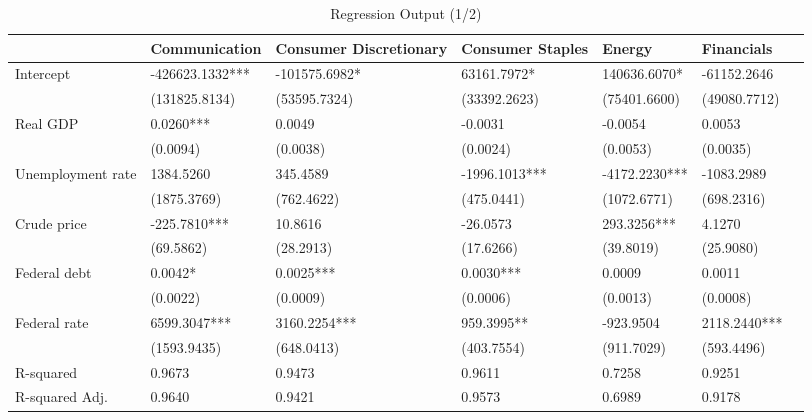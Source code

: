 \documentclass[a4paper,12pt]{article}
\begin{document}
\begin{table}
\caption{Regression Output (1/2)}
\label{}
\begin{center}
\tiny
\begin{tabular}{lllllll} \hline                  & Communication & Consumer Discretionary & Consumer Staples & Energy  & Financials  \\  \hline 
Intercept          & -426623.1332***     & -101575.6982*      & 63161.7972*        & 140636.6070*  & -61152.2646    \\                    & (131825.8134)       & (53595.7324)       & (33392.2623)       & (75401.6600)  & (49080.7712)     \\  
Real GDP          & 0.0260***           & 0.0049             & -0.0031            & -0.0054       & 0.0053          \\                   & (0.0094)            & (0.0038)           & (0.0024)           & (0.0053)      & (0.0035)           \\  
Unemployment rate & 1384.5260           & 345.4589           & -1996.1013***      & -4172.2230*** & -1083.2989        \\                    & (1875.3769)         & (762.4622)         & (475.0441)         & (1072.6771)   & (698.2316)        \\  
Crude price       & -225.7810***        & 10.8616            & -26.0573           & 293.3256***   & 4.1270   \\                    & (69.5862)           & (28.2913)          & (17.6266)          & (39.8019)     & (25.9080)    \\ 
Federal debt      & 0.0042*             & 0.0025***          & 0.0030***          & 0.0009        & 0.0011        \\                   & (0.0022)            & (0.0009)           & (0.0006)           & (0.0013)      & (0.0008)        \\ 
Federal rate      & 6599.3047***        & 3160.2254***       & 959.3995**         & -923.9504     & 2118.2440***    \\                    & (1593.9435)         & (648.0413)         & (403.7554)         & (911.7029)    & (593.4496)     \\ \hline  
R-squared          & 0.9673              & 0.9473             & 0.9611             & 0.7258        & 0.9251         \\  
R-squared Adj.     & 0.9640              & 0.9421             & 0.9573             & 0.6989        & 0.9178         \\ \hline
\end{tabular}
\end{center}
\end{table}
\end{document}
